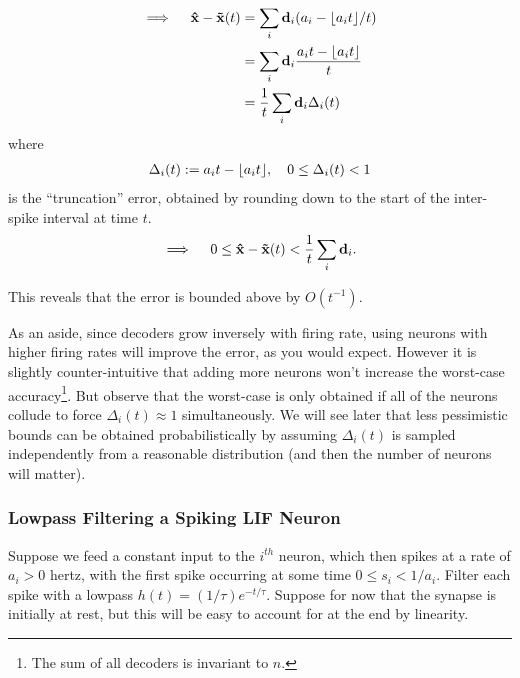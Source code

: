 \begin{align*}
\implies \quad \mathbf{\hat{x}} - \mathbf{\tilde{x}}(t) &= \sum_i \mathbf{d}_i (a_i - \lfloor {a_i t} \rfloor / t) \\
&= \sum_i \mathbf{d}_i \frac{a_i t - \lfloor {a_i t} \rfloor}{t} \\
&= \frac{1}{t} \sum_i \mathbf{d}_i \Delta_i(t)
\end{align*}
where
\begin{align*}
\Delta_i(t) := a_i t - \lfloor {a_i t} \rfloor, \quad 0 \le \Delta_i(t) < 1
\end{align*}
is the ``truncation'' error, obtained by rounding down to the start of the inter-spike interval at time $t$.
\begin{align*}
\implies \quad 0 \le \mathbf{\hat{x}} - \mathbf{\tilde{x}}(t) < \frac{1}{t} \sum_i \mathbf{d}_i .
\end{align*}

This reveals that the error is bounded above by $O(t^{-1})$.

As an aside, since decoders grow inversely with firing rate, using neurons with higher firing rates will improve the error, as you would expect. However it is slightly counter-intuitive that adding more neurons won't increase the worst-case accuracy\footnote{The sum of all decoders is invariant to $n$.}. But observe that the worst-case is only obtained if all of the neurons collude to force $\Delta_i(t) \approx 1$ simultaneously. We will see later that less pessimistic bounds can be obtained probabilistically by assuming $\Delta_i(t)$ is sampled independently from a reasonable distribution (and then the number of neurons will matter). 

\subsubsection{Lowpass Filtering a Spiking LIF Neuron}

Suppose we feed a constant input to the $i^{th}$ neuron, which then spikes at a rate of $a_i > 0$ hertz, with the first spike occurring at some time $0 \le s_i < 1/a_i$. Filter each spike with a lowpass $h(t) = (1 / \tau) e^{-t/\tau}$. Suppose for now that the synapse is initially at rest, but this will be easy to account for at the end by linearity. %

